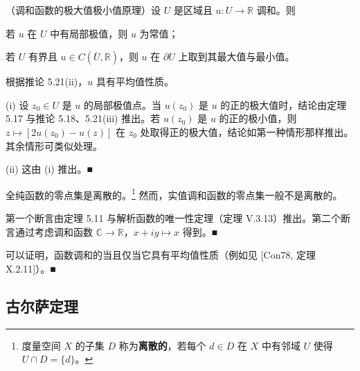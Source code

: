 \begin{corollary}

（调和函数的极大值极小值原理）设 $ U $ 是区域且 $ u : U \to \mathbb{R} $ 调和。则

\begin{subitems}
\item

若 $ u $ 在 $ U $ 中有局部极值，则 $ u $ 为常值；

\item

若 $ U $ 有界且 $ u \in C(\overline{U},\mathbb{R}) $，则 $ u $ 在 $ \partial U $ 上取到其最大值与最小值。

\proofhead
根据推论 5.21(ii)，$ u $ 具有平均值性质。
\end{subitems}

(i) 设 $ z_{0} \in U $ 是 $ u $ 的局部极值点。当 $ u(z_{0}) $ 是 $ u $ 的正的极大值时，结论由定理 5.17 与推论 5.18、5.21(iii) 推出。若 $ u(z_{0}) $ 是 $ u $ 的正的极小值，则 $ z \mapsto \left[2u(z_{0}) - u(z)\right] $ 在 $ z_{0} $ 处取得正的极大值，结论如第一种情形那样推出。其余情形可类似处理。

(ii) 这由 (i) 推出。\nobreak\hspace{0.35em}■

\end{corollary}

\begin{remark}

\begin{items}
\item

全纯函数的零点集是离散的。\footnote{度量空间 $ X $ 的子集 $ D $ 称为\textbf{离散的}，若每个 $ d \in D $ 在 $ X $ 中有邻域 $ U $ 使得 $ U\cap D = \{d\}$。} 然而，实值调和函数的零点集一般不是离散的。

\proofhead
第一个断言由定理 5.11 与解析函数的唯一性定理（定理 V.3.13）推出。第二个断言通过考虑调和函数 $ \mathbb{C} \to \mathbb{R} $，$ x + iy \mapsto x $ 得到。\nobreak\hspace{0.35em}■
\item

可以证明，函数调和的当且仅当它具有平均值性质（例如见 [Con78, 定理 X.2.11]）。\nobreak\hspace{0.35em}■

\end{items}

\end{remark}

\subsection*{古尔萨定理}

